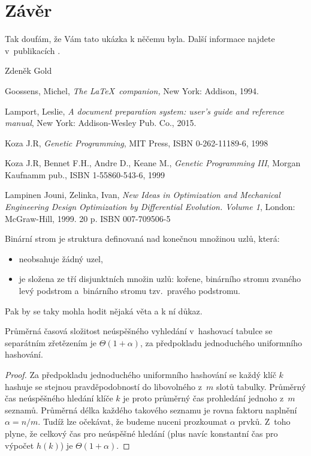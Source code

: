 \documentclass[bc,male,java,dept460]{diploma}		%
\begin{document}
\section{Závěr}
\label{sec:Conclusion}
Tak doufám, že Vám tato ukázka k něčemu byla. Další informace najdete v~publikacích
\cite{goossens94,lamport94}.

\bigskip
\begin{flushright}
Zdeněk Gold
\end{flushright}

\begin{thebibliography}{99}

 Goossens, Michel,
\textit{The \LaTeX\ companion,} New York: Addison, 1994.

 Lamport, Leslie,
\textit{A document preparation system: user's guide and reference manual},
New York: Addison-Wesley Pub. Co., 2015.

 Koza J.R, 
\textit{Genetic Programming},
MIT Press, ISBN 0-262-11189-6, 1998

 Koza J.R, Bennet F.H., Andre D., Keane M.,
\textit{Genetic Programming III},
Morgan Kaufnamm pub., ISBN 1-55860-543-6, 1999

 Lampinen Jouni, Zelinka, Ivan,
\textit{New Ideas in Optimization and Mechanical Engineering Design Optimization by Differential Evolution. Volume 1},
London: McGraw-Hill, 1999. 20 p. ISBN 007-709506-5

\end{thebibliography}




\begin{definition}
\label{def:BinVyhlStrom}
Binární strom je struktura definovaná nad konečnou množinou uzlů, která:
\begin{itemize}
\item neobsahuje žádný uzel,
\item je složena ze tří disjunktních množin uzlů:
      kořene, binárního stromu zvaného levý podstrom a~binárního stromu tzv.\ pravého podstromu.
\end{itemize}
\end{definition}

Pak by se taky mohla hodit nějaká věta a k ní důkaz.

\begin{theorem}
\label{VetaNeuspechSepar}
Průměrná časová složitost neúspěšného vyhledání  v~hashovací tabulce se  separátním zřetězením je $\Theta(1+\alpha)$, za předpokladu jednoduchého uniformního hashování.
\end{theorem}
\begin{proof}
Za předpokladu jednoduchého uniformního hashování se každý  klíč
$k$ hashuje se stejnou pravděpodobností do libovolného z~$m$ slotů
tabulky. Průměrný čas neúspěšného hledání klíče $k$ je proto
průměrný čas prohledání jednoho z~$m$ seznamů. Průměrná délka
každého takového seznamu je rovna faktoru naplnění $\alpha=n/m$.
Tudíž lze očekávat, že budeme nuceni prozkoumat $\alpha$ prvků.
Z~toho plyne, že celkový čas pro neúspěšné hledání (plus navíc
konstantní čas pro výpočet $h(k)$) je $\Theta(1+\alpha)$.
\end{proof}
\end{document}
